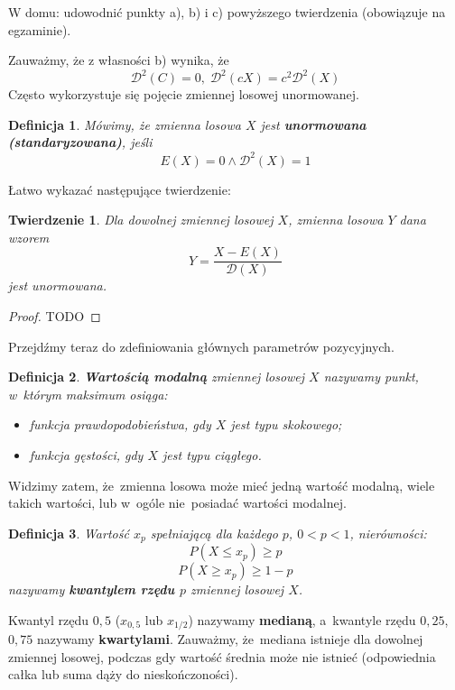 \documentclass[10pt,a4paper]{article}
\newtheorem{definition}{Definicja}[section]
\newtheorem{theorem}{Twierdzenie}[section]
\numberwithin{equation}{subsection}
\begin{document}
W domu: udowodnić punkty a), b) i c) powyższego twierdzenia (obowiązuje na
egzaminie).

Zauważmy, że z własności b) wynika, że
\[
  \mathscr{D}^2(C) = 0,\;\mathscr{D}^2(cX) = c^2\mathscr{D}^2(X)
\]
Często wykorzystuje się pojęcie zmiennej losowej unormowanej.

\begin{definition}
  Mówimy, że zmienna losowa $X$ jest \textbf{unormowana (standaryzowana)}, jeśli
  \[
    E(X) = 0 \land \mathscr{D}^2(X)=1
  \]
\end{definition}

Łatwo wykazać następujące twierdzenie:

\begin{theorem}
  Dla dowolnej zmiennej losowej $X$, zmienna losowa $Y$ dana wzorem
  \[
    Y = \frac{X-E(X)}{\mathscr{D}(X)}
  \]
  jest unormowana.
\end{theorem}
\begin{proof}
  TODO
\end{proof}

Przejdźmy teraz do zdefiniowania głównych parametrów pozycyjnych.

\begin{definition}
  \textbf{Wartością modalną} zmiennej losowej $X$ nazywamy punkt, w~którym
  maksimum osiąga:
  \begin{itemize}
    \item funkcja prawdopodobieństwa, gdy $X$ jest typu skokowego;
    \item funkcja gęstości, gdy $X$ jest typu ciągłego.
  \end{itemize}
\end{definition}

Widzimy zatem, że~zmienna losowa może mieć jedną wartość modalną, wiele takich
wartości, lub w~ogóle nie~posiadać wartości modalnej.

\begin{definition}
  Wartość $x_p$ spełniającą dla każdego $p$, $0<p<1$, nierówności:
  \[
    P(X\leq x_p)\geq p
  \]
  \[
    P(X\geq x_p)\geq 1-p
  \]
  nazywamy \textbf{kwantylem rzędu $p$} zmiennej losowej $X$.
\end{definition}

Kwantyl rzędu $0,5$ ($x_{0,5}$ lub $x_{1/2}$) nazywamy \textbf{medianą},
a~kwantyle rzędu $0,25$, $0,75$ nazywamy \textbf{kwartylami}. Zauważmy,
że~mediana istnieje dla dowolnej zmiennej losowej, podczas gdy wartość średnia
może nie istnieć (odpowiednia całka lub suma dąży do nieskończoności).
\end{document}

